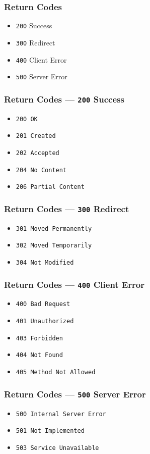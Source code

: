\documentclass[dvipsnames]{beamer}
\begin{document}
\begin{frame}
  \frametitle{Return Codes}
  \begin{itemize}
    \item \texttt{200} Success 
    \item \texttt{300} Redirect
    \item \texttt{400} Client Error
    \item \texttt{500} Server Error
  \end{itemize}
\end{frame}


\begin{frame}
  \frametitle{Return Codes --- \texttt{200} Success}
  \begin{itemize}
    \item \texttt{200 OK}
    \item \texttt{201 Created}
    \item \texttt{202 Accepted}
    \item \texttt{204 No Content}
    \item \texttt{206 Partial Content}
  \end{itemize}
\end{frame}


\begin{frame}
  \frametitle{Return Codes --- \texttt{300} Redirect}
  \begin{itemize}
    \item \texttt{301 Moved Permanently}
    \item \texttt{302 Moved Temporarily}
    \item \texttt{304 Not Modified}
  \end{itemize}
\end{frame}


\begin{frame}
  \frametitle{Return Codes --- \texttt{400} Client Error}
  \begin{itemize}
    \item \texttt{400 Bad Request}
    \item \texttt{401 Unauthorized}
    \item \texttt{403 Forbidden}
    \item \texttt{404 Not Found}
    \item \texttt{405 Method Not Allowed}
  \end{itemize}
\end{frame}


\begin{frame}
  \frametitle{Return Codes --- \texttt{500} Server Error}
  \begin{itemize}
    \item \texttt{500 Internal Server Error}
    \item \texttt{501 Not Implemented}
    \item \texttt{503 Service Unavailable}
  \end{itemize}
\end{frame}
\end{document}

